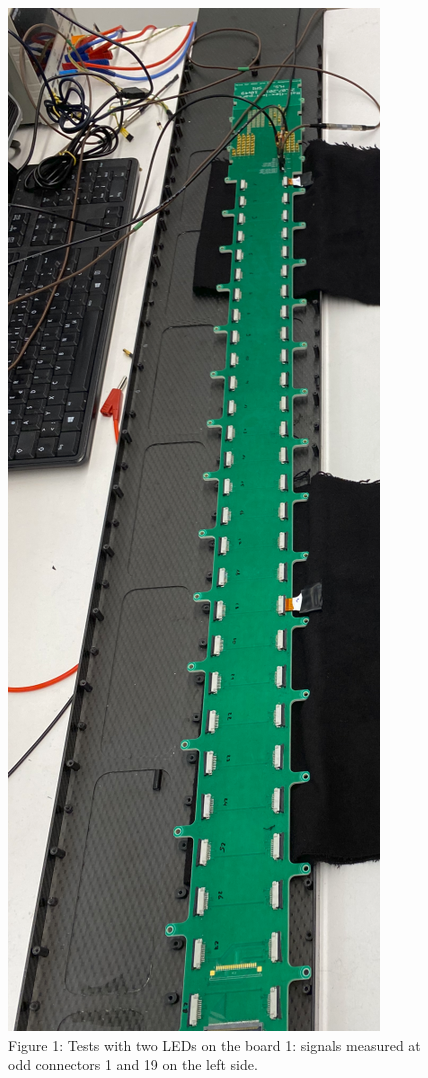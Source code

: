 \documentclass[../BTOF_summary.tex]{subfiles}
\begin{document}
\begin{figure}[h!]
    \centering
    \includegraphics[scale=0.2, angle =270]{Pictures/pic1.png}
    \caption{Figure 1: Tests with two LEDs on the board 1: signals measured at odd connectors 1 and 19 on the left side.}
    \label{fig:TD}
\end{figure}
\end{document}
